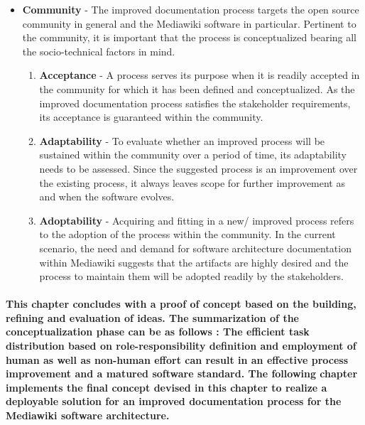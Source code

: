 \begin{itemize}
\item \textbf{Community} - The improved documentation process targets the open source community in general and the Mediawiki software in particular. Pertinent to the community, it is important that the process is conceptualized bearing all the socio-technical factors in mind. 
\begin{enumerate}
\item \textbf{Acceptance} - A process serves its purpose when it is readily accepted in the community for which it has been defined and conceptualized. As the improved documentation process satisfies the stakeholder requirements, its acceptance is guaranteed within the community. 
\item \textbf{Adaptability} - To evaluate whether an improved process will be sustained within the community over a period of time, its adaptability needs to be assessed. Since the suggested process is an improvement over the existing process, it always leaves scope for further improvement as and when the software evolves.
\item \textbf{Adoptability} - Acquiring and fitting in a new/ improved process refers to the adoption of the process within the community. In the current scenario, the need and demand for software architecture documentation within Mediawiki suggests that the artifacts are highly desired and the process to maintain them will be adopted readily by the stakeholders. 
\end{enumerate}
\end{itemize}

\paragraph{This chapter concludes with a proof of concept based on the building, refining and evaluation of ideas. The summarization of the conceptualization phase can be as follows : The efficient task distribution based on role-responsibility definition and employment of human as well as non-human effort can result in an effective process improvement and a matured software standard. The following chapter implements the final concept devised in this chapter to realize a deployable solution for an improved documentation process for the Mediawiki software architecture. }